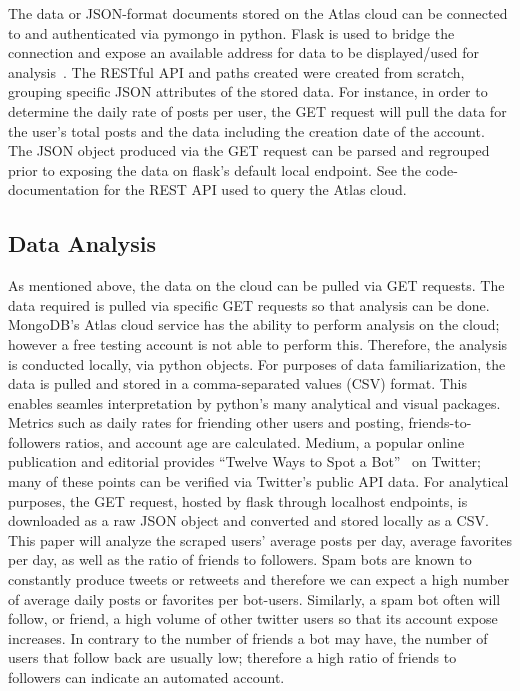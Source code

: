 The data or JSON-format documents stored on the Atlas cloud can be connected to
and authenticated via pymongo in python. Flask is used to bridge the connection
and expose an available address for data to be displayed/used for
analysis~\cite{FlaskREST}. The RESTful API and paths created were created from
scratch, grouping specific JSON attributes of the stored data. For instance, in
order to determine the daily rate of posts per user, the GET request will pull
the data for the user's total posts and the data including the creation date of
the account. The JSON object produced via the GET request can be parsed and
regrouped prior to exposing the data on flask's default local endpoint. See the
code-documentation for the REST API used to query the Atlas cloud.

\subsection{Data Analysis}

As mentioned above, the data on the cloud can be pulled via GET requests. The
data required is pulled via specific GET requests so that analysis can be done.
MongoDB's Atlas cloud service has the ability to perform analysis on the cloud;
however a free testing account is not able to perform this. Therefore, the
analysis is conducted locally, via python objects. For purposes of data
familiarization, the data is pulled and stored in a comma-separated values
(CSV) format. This enables seamles interpretation by python's many analytical
and visual packages. Metrics such as daily rates for friending other users and
posting, friends-to-followers ratios, and account age are calculated. Medium, a
popular online publication and editorial provides ``Twelve Ways to Spot a
Bot''~\cite{HowToSpotABot} on Twitter; many of these points can be verified via
Twitter's public API data. For analytical purposes, the GET request, hosted by
flask through localhost endpoints, is downloaded as a raw JSON object and
converted and stored locally as a CSV. This paper will analyze the scraped
users' average posts per day, average favorites per day, as well as the ratio
of friends to followers. Spam bots are known to constantly produce tweets or
retweets and therefore we can expect a high number of average daily posts or
favorites per bot-users. Similarly, a spam bot often will follow, or friend, a
high volume of other twitter users so that its account expose increases. In
contrary to the number of friends a bot may have, the number of users that
follow back are usually low; therefore a high ratio of friends to followers can
indicate an automated account.

